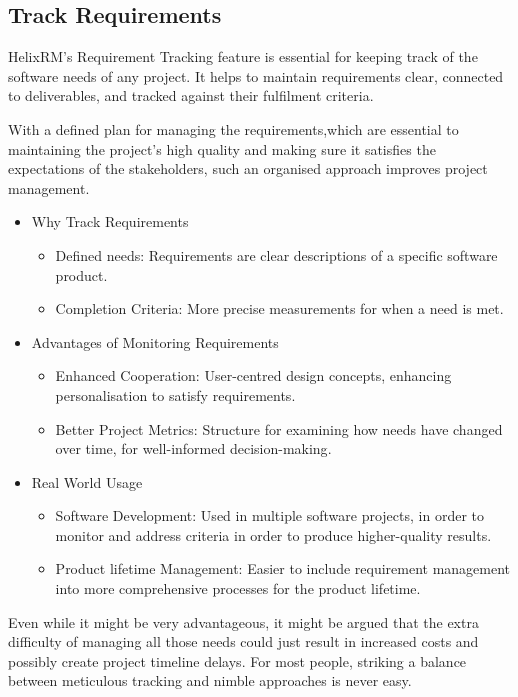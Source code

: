 \subsection{Track Requirements}

HelixRM's Requirement Tracking feature is essential for keeping
track of the software needs of any project.
It helps to maintain requirements clear, connected to
deliverables, and tracked against their fulfilment criteria.

With a defined plan for managing the requirements,which
are essential to maintaining the project's high quality and
making sure it satisfies the expectations of the stakeholders,
such an organised approach improves project management.

\begin{itemize}
    \item Why Track Requirements
    \begin{itemize}
        \item Defined needs: Requirements are clear descriptions of a specific software product\cite{b1}.
        \item Completion Criteria: More precise measurements for when a need is met\cite{b2}.
    \end{itemize}

    \item Advantages of Monitoring Requirements
    \begin{itemize}
        \item Enhanced Cooperation: User-centred design concepts, enhancing personalisation to satisfy requirements\cite{b3}.
        \item Better Project Metrics: Structure for examining how needs have changed over time, for well-informed decision-making\cite{b2}.
    \end{itemize}

    \item Real World Usage
    \begin{itemize}
        \item Software Development: Used in multiple software projects, in order to monitor and address criteria in order to produce higher-quality results\cite{b4}.
        \item Product lifetime Management: Easier to include requirement management into more comprehensive processes for the product lifetime\cite{b3}.
    \end{itemize}
\end{itemize}

Even while it might be very advantageous, it might be
argued that the extra difficulty of managing all those needs
could just result in increased costs and possibly create project
timeline delays.
For most people, striking a balance between meticulous
tracking and nimble approaches is never easy.

